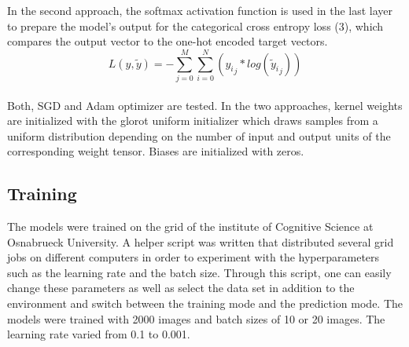 \documentclass[12pt,letterpaper]{article}
\begin{document}
In the second approach, the softmax activation function is used in the last layer to prepare the model’s output for the categorical cross entropy loss (3), which compares the output vector to the one-hot encoded target vectors. 
\begin{equation}
L(y, \tilde{y}) = -\sum_{j=0}^M\sum_{i=0}^N({y_i}_j*log({\tilde{y}_i}_j))
\end{equation}
\\
Both, SGD and Adam optimizer are tested. In the two approaches, kernel weights are initialized with the glorot uniform initializer which draws samples from a uniform distribution depending on the number of input and output units of the corresponding weight tensor. Biases are initialized with zeros.


\subsection{Training}
The models were trained on the grid of the institute of Cognitive Science at Osnabrueck University. A helper script was written that distributed several grid jobs on different computers in order to experiment with the hyperparameters such as the learning rate and the batch size. Through this script, one can easily change these parameters as well as select the data set in addition to the environment and switch between the training mode and the prediction mode. The models were trained with 2000 images and batch sizes of 10 or 20 images. The learning rate varied from 0.1 to 0.001.
\end{document}
